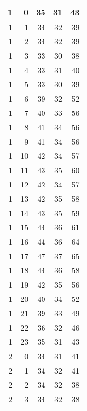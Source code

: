     \begin{longtable}{|r|r|r|r|r|}
		\hline
    1     & 0     & 35    & 31    & 43 \\
    \hline
    1     & 1     & 34    & 32    & 39 \\
    \hline
    1     & 2     & 34    & 32    & 39 \\
    \hline
    1     & 3     & 33    & 30    & 38 \\
    \hline
    1     & 4     & 33    & 31    & 40 \\
    \hline
    1     & 5     & 33    & 30    & 39 \\
    \hline
    1     & 6     & 39    & 32    & 52 \\
    \hline
    1     & 7     & 40    & 33    & 56 \\
    \hline
    1     & 8     & 41    & 34    & 56 \\
    \hline
    1     & 9     & 41    & 34    & 56 \\
    \hline
    1     & 10    & 42    & 34    & 57 \\
    \hline
    1     & 11    & 43    & 35    & 60 \\
    \hline
    1     & 12    & 42    & 34    & 57 \\
    \hline
    1     & 13    & 42    & 35    & 58 \\
    \hline
    1     & 14    & 43    & 35    & 59 \\
    \hline
    1     & 15    & 44    & 36    & 61 \\
    \hline
    1     & 16    & 44    & 36    & 64 \\
    \hline
    1     & 17    & 47    & 37    & 65 \\
    \hline
    1     & 18    & 44    & 36    & 58 \\
    \hline
    1     & 19    & 42    & 35    & 56 \\
    \hline
    1     & 20    & 40    & 34    & 52 \\
    \hline
    1     & 21    & 39    & 33    & 49 \\
    \hline
    1     & 22    & 36    & 32    & 46 \\
    \hline
    1     & 23    & 35    & 31    & 43 \\
    \hline
    2     & 0     & 34    & 31    & 41 \\
    \hline
    2     & 1     & 34    & 32    & 41 \\
    \hline
    2     & 2     & 34    & 32    & 38 \\
    \hline
    2     & 3     & 34    & 32    & 38 \\

\end{longtable}
